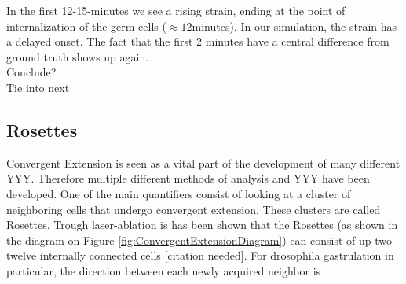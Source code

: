In the first 12-15-minutes we see a rising strain, ending at the point of internalization of the germ cells ($\approx12$minutes). In our simulation, the strain has a delayed onset. The fact that the first 2 minutes have a central difference from ground truth shows up again.\\

Conclude?\\

Tie into next\\

\subsection{Rosettes}
Convergent Extension is seen as a vital part of the development of many different YYY. Therefore multiple different methods of analysis and YYY have been developed.
One of the main quantifiers consist of looking at a cluster of neighboring cells that undergo convergent extension. These clusters are called Rosettes. Trough laser-ablation is has been shown that the Rosettes (as shown in the diagram on Figure \ref{fig:ConvergentExtensionDiagram}) can consist of up two twelve internally connected cells [citation needed].
For drosophila gastrulation in particular, the direction between each newly acquired neighbor is 





